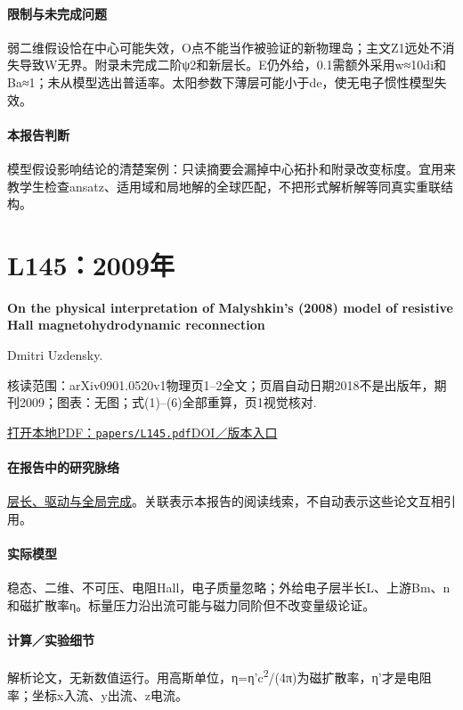 \documentclass[UTF8,a4paper,11pt,openany,fontset=fandol]{ctexbook}
\begin{document}
\paragraph{限制与未完成问题}弱二维假设恰在中心可能失效，O点不能当作被验证的新物理岛；主文Z1远处不消失导致W无界。附录未完成二阶ψ2和新层长。E仍外给，0.1需额外采用w≈10di和Ba≈1；未从模型选出普适率。太阳参数下薄层可能小于de，使无电子惯性模型失效。

\paragraph{本报告判断}模型假设影响结论的清楚案例：只读摘要会漏掉中心拓扑和附录改变标度。宜用来教学生检查ansatz、适用域和局地解的全球匹配，不把形式解析解等同真实重联结构。

\section{L145：2009年}\label{paper:L145}

\textbf{On the physical interpretation of Malyshkin’s (2008) model of resistive Hall magnetohydrodynamic reconnection}\citep{L145}\

Dmitri Uzdensky.

\textsf{核读范围：}arXiv0901.0520v1物理页1–2全文；页眉自动日期2018不是出版年，期刊2009；\textsf{图表：}无图；式(1)–(6)全部重算，页1视觉核对.

\href{run:../papers/L145.pdf}{打开本地PDF：\texttt{papers/L145.pdf}}\quad\href{https://doi.org/10.1063/1.3125819}{DOI／版本入口}

\paragraph{在报告中的研究脉络}\hyperref[story:global]{层长、驱动与全局完成}。关联表示本报告的阅读线索，不自动表示这些论文互相引用。

\paragraph{实际模型}稳态、二维、不可压、电阻Hall，电子质量忽略；外给电子层半长L、上游Bm、n和磁扩散率η。标量压力沿出流可能与磁力同阶但不改变量级论证。

\paragraph{计算／实验细节}解析论文，无新数值运行。用高斯单位，η=η'c\textsuperscript{2}/(4π)为磁扩散率，η'才是电阻率；坐标x入流、y出流、z电流。
\end{document}
